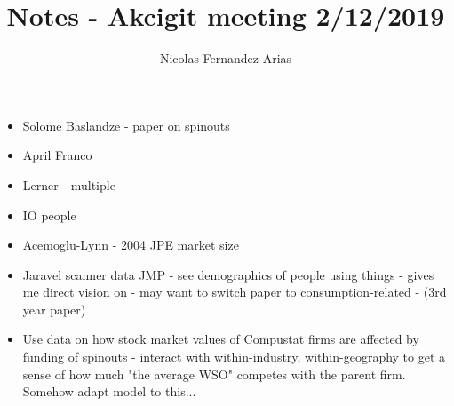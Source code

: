 \documentclass[12pt,english]{article}
\theoremstyle{remark}
\begin{document}
	
\title{Notes - Akcigit meeting 2/12/2019}
\author{Nicolas Fernandez-Arias}
\maketitle

\begin{itemize}
	\item Solome Baslandze - paper on spinouts
	\item April Franco 
	\item Lerner - multiple 
	\item IO people
	\item Acemoglu-Lynn - 2004 JPE market size
	\item Jaravel scanner data JMP - see demographics of people using things - gives me direct vision on - may want to switch paper to consumption-related - (3rd year paper)
	\item Use data on how stock market values of Compustat firms are affected by funding of spinouts - interact with within-industry, within-geography to get a sense of how much "the average WSO" competes with the parent firm. Somehow adapt model to this...
\end{itemize}
\end{document}

